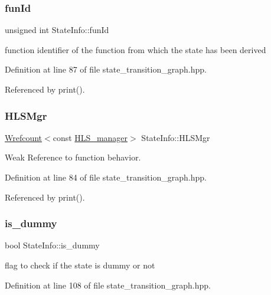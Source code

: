 \subsubsection{\texorpdfstring{fun\+Id}{funId}}
{\footnotesize\ttfamily unsigned int State\+Info\+::fun\+Id}



function identifier of the function from which the state has been derived 



Definition at line 87 of file state\+\_\+transition\+\_\+graph.\+hpp.



Referenced by print().

\mbox{\label{structStateInfo_ad9d6e719a4e7174e79525787007ff965}} 
\subsubsection{\texorpdfstring{H\+L\+S\+Mgr}{HLSMgr}}
{\footnotesize\ttfamily \hyperlink{classWrefcount}{Wrefcount}$<$const \hyperlink{classHLS__manager}{H\+L\+S\+\_\+manager}$>$ State\+Info\+::\+H\+L\+S\+Mgr}



Weak Reference to function behavior. 



Definition at line 84 of file state\+\_\+transition\+\_\+graph.\+hpp.



Referenced by print().

\mbox{\label{structStateInfo_a2e25972bb3ed0e6d42b33f71db4da2bd}} 
\subsubsection{\texorpdfstring{is\+\_\+dummy}{is\_dummy}}
{\footnotesize\ttfamily bool State\+Info\+::is\+\_\+dummy}



flag to check if the state is dummy or not 



Definition at line 108 of file state\+\_\+transition\+\_\+graph.\+hpp.

